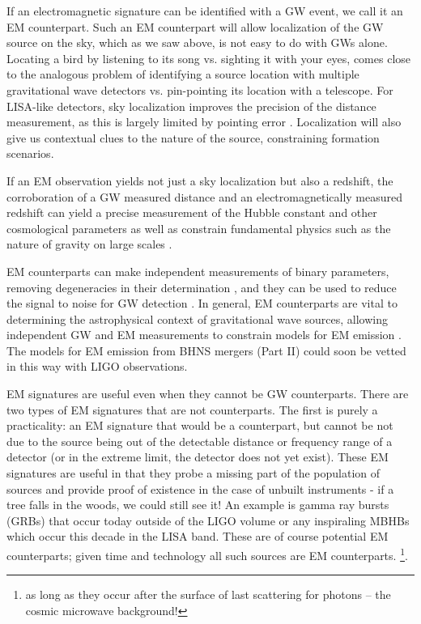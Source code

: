 If an electromagnetic signature can be identified with a GW event, we call it
an EM counterpart. Such an EM counterpart will allow localization of the GW
source on the sky, which as we saw above, is not easy to do with GWs alone.
Locating a bird by listening to its song vs. sighting it with your eyes, comes
close to the analogous problem of identifying a source location with multiple
gravitational wave detectors vs. pin-pointing its location with a telescope.
For LISA-like detectors, sky localization improves the
precision of the distance measurement, as this is largely limited by pointing
error \citep{Cutler:1998, Hughes:2002}. Localization will also give us contextual
clues to the nature of the source, constraining formation scenarios.


If an EM observation yields not just a sky localization but also a redshift,
the corroboration of a GW measured distance and an electromagnetically
measured redshift can yield a precise measurement of the Hubble constant and
other cosmological parameters \citep{Schutz:1986, KrolakSchutz:1987,
ChernoffFinn:1993, Schutz:2002, HolzHughes:2005, Dalal:2006, Kocsis+2006,
Kocsis+2008, CutlerHolz:2009,  Nissanke:GRBStndSirens:2010, Nishizawa:StndSirens:2011, Taylor:StndSirens:2012,
Tamanini:2016} as well as constrain fundamental physics such as the nature of
gravity on large scales \citep{Deffayet:2007, Camera:StndSirens:2013}.

EM counterparts can make independent measurements of binary parameters, removing
degeneracies in their determination \citep{HughesHolz:2003}, and they can be
used to reduce the signal to noise for GW detection \citep{KochanekPiran:1993,
HarryFairhurst:2011}. In general, EM counterparts are vital to determining the
astrophysical context of gravitational wave sources, allowing independent GW
and EM measurements to constrain models for EM emission \citep{Phinney:2009,
MandelO'Sh:2010}. The models for EM emission from BHNS mergers (Part II) could
soon be vetted in this way with LIGO observations.

EM signatures are useful even when they cannot be GW counterparts. There are
two types of EM signatures that are not counterparts. The first is  purely a
practicality: an EM signature that would be a counterpart, but cannot be not
due to the source being out of the detectable distance or frequency range of a
detector (or in the extreme limit, the detector does not yet exist). These EM
signatures are useful in that they probe a missing part of the population of
sources and provide proof of existence in the case of unbuilt instruments - if
a tree falls in the woods, we could still see it! An example is gamma ray
bursts (GRBs) that occur today outside of the LIGO volume or any inspiraling
MBHBs which occur this decade in the LISA band. These are of course potential
EM counterparts; given time and technology all such sources are EM
counterparts. \footnote{as long as they occur after the surface of last
scattering for photons -- the cosmic microwave background!}. 

